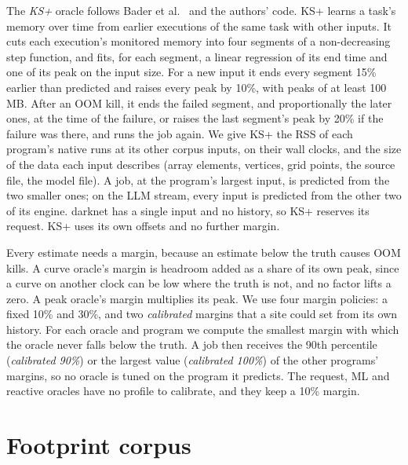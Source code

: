 \documentclass[11pt]{article}
\newcommand{\term}[1]{\emph{#1}}
\begin{document}
The \term{KS+} oracle follows Bader et al.~\cite{KSplus2024} and the authors' code. KS+ learns a task's
memory over time from earlier executions of the same task with other inputs. It cuts each execution's monitored
memory into four segments of a non-decreasing step function, and fits, for each segment, a linear regression of
its end time and one of its peak on the input size. For a new input it ends every segment 15\% earlier than
predicted and raises every peak by 10\%, with peaks of at least 100\,MB. After an OOM kill, it ends the failed
segment, and proportionally the later ones, at the time of the failure, or raises the last segment's peak by
20\% if the failure was there, and runs the job again. We give KS+ the RSS of each program's native runs at its
other corpus inputs, on their wall clocks, and the size of the data each input describes (array elements,
vertices, grid points, the source file, the model file). A job, at the program's largest input, is predicted
from the two smaller ones; on the LLM stream, every input is predicted from the other two of its engine. darknet
has a single input and no history, so KS+ reserves its request. KS+ uses its own offsets and no further margin.

Every estimate needs a margin, because an estimate below the truth causes OOM kills. A curve oracle's margin is
headroom added as a share of its own peak, since a curve on another clock can be low where the truth is not,
and no factor lifts a zero. A peak oracle's margin multiplies its peak. We use four margin policies: a fixed
10\% and 30\%, and two \term{calibrated} margins that a site could set from its own history. For each oracle and
program we compute the smallest margin with which the oracle never falls below the truth. A job then receives
the 90th percentile (\term{calibrated 90\%}) or the largest value (\term{calibrated 100\%}) of the other
programs' margins, so no oracle is tuned on the program it predicts. The request, ML and reactive oracles have no
profile to calibrate, and they keep a 10\% margin.


\section{Footprint corpus}
\label{sec:corpus}
\end{document}
